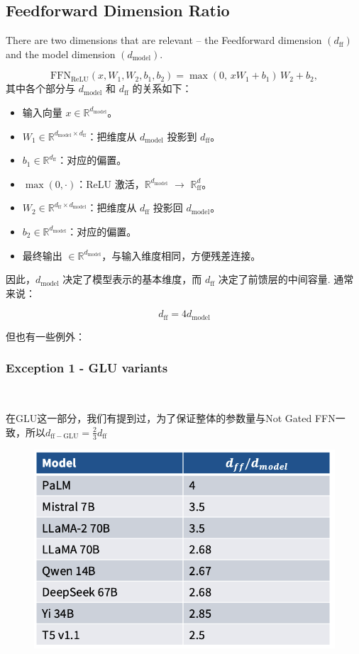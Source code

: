 \subsection{Feedforward Dimension Ratio}

There are two dimensions that are relevant -- the Feedforward dimension $(d_{\mathrm{ff}})$ and the model dimension $(d_{\mathrm{model}})$.
    
\begin{equation}
\mathrm{FFN}_{\mathrm{ReLU}}(x, W_1, W_2, b_1, b_2) 
= \max(0,\, xW_1+b_1)\,W_2 + b_2,
\end{equation}
其中各个部分与 $d_{\mathrm{model}}$ 和 $d_{\mathrm{ff}}$ 的关系如下：

\begin{itemize}
  \item 输入向量 $x \in \mathbb{R}^{d_{\mathrm{model}}}$。
  \item $W_1 \in \mathbb{R}^{d_{\mathrm{model}} \times d_{\mathrm{ff}}}$：把维度从 $d_{\mathrm{model}}$ 投影到 $d_{\mathrm{ff}}$。
  \item $b_1 \in \mathbb{R}^{d_{\mathrm{ff}}}$：对应的偏置。
  \item $\max(0,\cdot)$：ReLU 激活，$\mathbb{R}^{d_{\mathrm{model}}}$ $\rightarrow$ $\mathbb{R}^d_{\mathrm{ff}}$。
  \item $W_2 \in \mathbb{R}^{d_{\mathrm{ff}} \times d_{\mathrm{model}}}$：把维度从 $d_{\mathrm{ff}}$ 投影回 $d_{\mathrm{model}}$。
  \item $b_2 \in \mathbb{R}^{d_{\mathrm{model}}}$：对应的偏置。
  \item 最终输出 $\in \mathbb{R}^{d_{\mathrm{model}}}$，与输入维度相同，方便残差连接。
\end{itemize}

因此，$d_{\mathrm{model}}$ 决定了模型表示的基本维度，而 $d_{\mathrm{ff}}$ 决定了前馈层的中间容量.
通常来说：

\textbf{\[
d_{\mathrm{ff}} = 4 d_{\mathrm{model}}
\]}

但也有一些例外：
\subsubsection{Exception 1 - GLU variants}~{}

在GLU这一部分，我们有提到过，为了保证整体的参数量与Not Gated FFN一致，所以$d_{\mathrm{ff-GLU}} = \frac{2}{3} d_{\mathrm{ff}}$

\begin{figure}[htbp]
  \centering
  \includegraphics[width=0.65\linewidth]{figs/lec3/lec3.20.png}
\end{figure}

